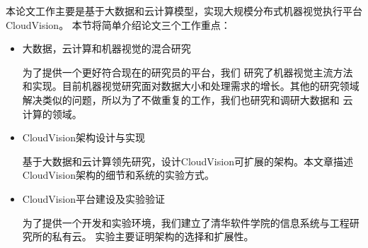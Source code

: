 本论文工作主要是基于大数据和云计算模型，实现大规模分布式机器视觉执行平台CloudVision。
本节将简单介绍论文三个工作重点：
\begin{itemize}
  \item 大数据，云计算和机器视觉的混合研究

        为了提供一个更好符合现在的研究员的平台，我们
        研究了机器视觉主流方法和实现。目前机器视觉研究面对数据大小和处理需求的增长。其他的研究领域
        解决类似的问题，所以为了不做重复的工作，我们也研究和调研大数据和
        云计算的领域。

  \item CloudVision架构设计与实现

        基于大数据和云计算领先研究，设计CloudVision可扩展的架构。本文章描述
        CloudVision架构的细节和系统的实验方式。

  \item CloudVision平台建设及实验验证

        为了提供一个开发和实验环境，我们建立了清华软件学院的信息系统与工程研究所的私有云。
        实验主要证明架构的选择和扩展性。

\end{itemize}


